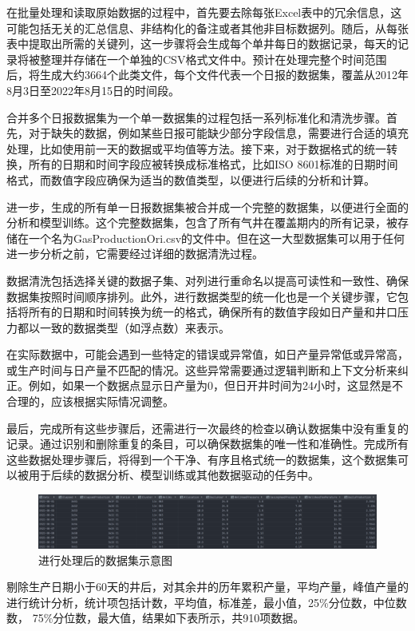 在批量处理和读取原始数据的过程中，首先要去除每张Excel表中的冗余信息，这可能包括无关的汇总信息、非结构化的备注或者其他非目标数据列。随后，从每张表中提取出所需的关键列，这一步骤将会生成每个单井每日的数据记录，每天的记录将被整理并存储在一个单独的CSV格式文件中。预计在处理完整个时间范围后，将生成大约3664个此类文件，每个文件代表一个日报的数据集，覆盖从2012年8月3日至2022年8月15日的时间段。

合并多个日报数据集为一个单一数据集的过程包括一系列标准化和清洗步骤。首先，对于缺失的数据，例如某些日报可能缺少部分字段信息，需要进行合适的填充处理，比如使用前一天的数据或平均值等方法。接下来，对于数据格式的统一转换，所有的日期和时间字段应被转换成标准格式，比如ISO 8601标准的日期时间格式，而数值字段应确保为适当的数值类型，以便进行后续的分析和计算。

进一步，生成的所有单一日报数据集被合并成一个完整的数据集，以便进行全面的分析和模型训练。这个完整数据集，包含了所有气井在覆盖期内的所有记录，被存储在一个名为GasProductionOri.csv的文件中。但在这一大型数据集可以用于任何进一步分析之前，它需要经过详细的数据清洗过程。

数据清洗包括选择关键的数据子集、对列进行重命名以提高可读性和一致性、确保数据集按照时间顺序排列。此外，进行数据类型的统一化也是一个关键步骤，它包括将所有的日期和时间转换为统一的格式，确保所有的数值字段如日产量和井口压力都以一致的数据类型（如浮点数）来表示。

在实际数据中，可能会遇到一些特定的错误或异常值，如日产量异常低或异常高，或生产时间与日产量不匹配的情况。这些异常需要通过逻辑判断和上下文分析来纠正。例如，如果一个数据点显示日产量为0，但日开井时间为24小时，这显然是不合理的，应该根据实际情况调整。

最后，完成所有这些步骤后，还需进行一次最终的检查以确认数据集中没有重复的记录。通过识别和删除重复的条目，可以确保数据集的唯一性和准确性。完成所有这些数据处理步骤后，将得到一个干净、有序且格式统一的数据集，这个数据集可以被用于后续的数据分析、模型训练或其他数据驱动的任务中。
\begin{figure}[H]
    \centering
    \includegraphics{figure/afterprocessdata.png}
    \caption{进行处理后的数据集示意图}
    \label{fig:afterprocess}
\end{figure}

剔除生产日期小于60天的井后，对其余井的历年累积产量，平均产量，峰值产量的进行统计分析，统计项包括计数，平均值，标准差，最小值，25\%分位数，中位数数，
75\%分位数，最大值，结果如下表所示，共910项数据。

